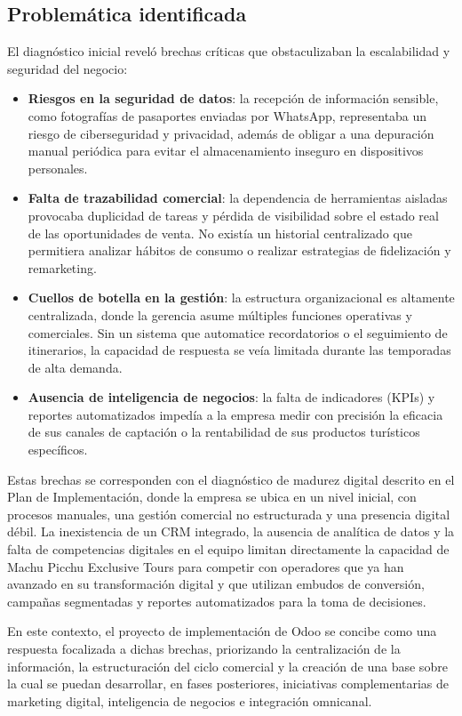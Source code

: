 \subsection{Problemática identificada}

\begin{indentedsubsection}
El diagnóstico inicial reveló brechas críticas que obstaculizaban la escalabilidad y seguridad del negocio:

\begin{itemize}
    \item[A.] \textbf{Riesgos en la seguridad de datos}: la recepción de información sensible, como fotografías de pasaportes enviadas por WhatsApp, representaba un riesgo de ciberseguridad y privacidad, además de obligar a una depuración manual periódica para evitar el almacenamiento inseguro en dispositivos personales.
    \item[B.] \textbf{Falta de trazabilidad comercial}: la dependencia de herramientas aisladas provocaba duplicidad de tareas y pérdida de visibilidad sobre el estado real de las oportunidades de venta. No existía un historial centralizado que permitiera analizar hábitos de consumo o realizar estrategias de fidelización y remarketing.
    \item[C.] \textbf{Cuellos de botella en la gestión}: la estructura organizacional es altamente centralizada, donde la gerencia asume múltiples funciones operativas y comerciales. Sin un sistema que automatice recordatorios o el seguimiento de itinerarios, la capacidad de respuesta se veía limitada durante las temporadas de alta demanda.
    \item[D.] \textbf{Ausencia de inteligencia de negocios}: la falta de indicadores (KPIs) y reportes automatizados impedía a la empresa medir con precisión la eficacia de sus canales de captación o la rentabilidad de sus productos turísticos específicos.
\end{itemize}

Estas brechas se corresponden con el diagnóstico de madurez digital descrito en el Plan de Implementación, donde la empresa se ubica en un nivel inicial, con procesos manuales, una gestión comercial no estructurada y una presencia digital débil. La inexistencia de un CRM integrado, la ausencia de analítica de datos y la falta de competencias digitales en el equipo limitan directamente la capacidad de Machu Picchu Exclusive Tours para competir con operadores que ya han avanzado en su transformación digital y que utilizan embudos de conversión, campañas segmentadas y reportes automatizados para la toma de decisiones.

En este contexto, el proyecto de implementación de Odoo se concibe como una respuesta focalizada a dichas brechas, priorizando la centralización de la información, la estructuración del ciclo comercial y la creación de una base sobre la cual se puedan desarrollar, en fases posteriores, iniciativas complementarias de marketing digital, inteligencia de negocios e integración omnicanal.

\end{indentedsubsection}

